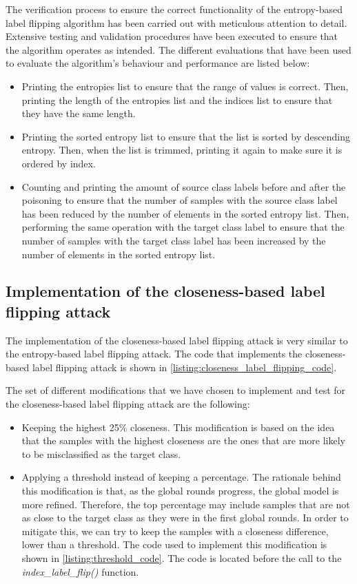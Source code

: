 The verification process to ensure the correct functionality of the entropy-based label flipping algorithm has been carried out with meticulous attention to detail. Extensive testing and validation procedures have been executed to ensure that the algorithm operates as intended. The different evaluations that have been used to evaluate the algorithm's behaviour and performance are listed below:
\begin{itemize}
        \item Printing the entropies list to ensure that the range of values is correct. Then, printing the length of the entropies list and the indices list to ensure that they have the same length.
        \item Printing the sorted entropy list to ensure that the list is sorted by descending entropy. Then, when the list is trimmed, printing it again to make sure it is ordered by index.
        \item Counting and printing the amount of source class labels before and after the poisoning to ensure that the number of samples with the source class label has been reduced by the number of elements in the sorted entropy list. Then, performing the same operation with the target class label to ensure that the number of samples with the target class label has been increased by the number of elements in the sorted entropy list.
\end{itemize}




\subsection{Implementation of the closeness-based label flipping attack}
The implementation of the closeness-based label flipping attack is very similar to the entropy-based label flipping attack. The code that implements the closeness-based label flipping attack is shown in \autoref{listing:closeness_label_flipping_code}.

The set of different modifications that we have chosen to implement and test for the closeness-based label flipping attack are the following:
\begin{itemize}
        \item Keeping the highest 25\% closeness. This modification is based on the idea that the samples with the highest closeness are the ones that are more likely to be misclassified as the target class.
        \item Applying a threshold instead of keeping a percentage. The rationale behind this modification is that, as the global rounds progress, the global model is more refined. Therefore, the top percentage may include samples that are not as close to the target class as they were in the first global rounds. In order to mitigate this, we can try to keep the samples with a closeness difference, lower than a threshold. The code used to implement this modification is shown in \autoref{listing:threshold_code}. The code is located before the call to the \textit{index\_label\_flip()} function.
\end{itemize}



